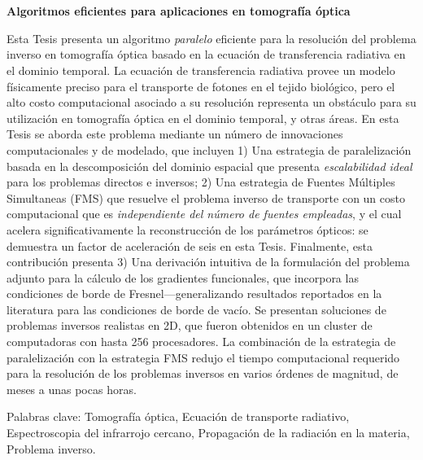 \pagestyle{empty}
\chapter*{}

\begin{center}
\begin{large}
\textbf{Algoritmos eficientes para aplicaciones en tomografía óptica}
\end{large}
\end{center}

\vspace{1cm}
Esta Tesis presenta un algoritmo {\em paralelo} eficiente  
para la resolución del problema inverso en 
tomografía óptica basado en la ecuación de transferencia radiativa en el dominio temporal. 
La ecuación de transferencia radiativa provee un modelo 
físicamente preciso para el transporte de fotones 
en el tejido biológico, pero el alto costo computacional 
asociado a su resolución representa un obstáculo 
para su utilización en tomografía óptica en el dominio 
temporal, y otras áreas. En esta Tesis se aborda este problema 
mediante un número de innovaciones computacionales y de 
modelado, que incluyen 1) Una estrategia de paralelización 
basada en la descomposición del dominio espacial que presenta 
\textit{escalabilidad ideal} para los problemas directos 
e inversos; 2) Una estrategia de Fuentes Múltiples Simultaneas 
(FMS) que resuelve el problema inverso de transporte 
con un costo computacional que es {\em independiente del 
número de fuentes empleadas}, y el cual acelera significativamente la reconstrucción de los parámetros ópticos: 
se demuestra un factor de aceleración de seis en esta Tesis. 
Finalmente, esta contribución presenta 3) Una derivación 
intuitiva de la formulación del problema adjunto para la 
cálculo de los gradientes funcionales, que incorpora 
las condiciones de borde de Fresnel---generalizando 
resultados reportados en la literatura para las condiciones 
de borde de vacío. Se presentan 
soluciones de problemas inversos realistas en 2D, 
que fueron obtenidos en un cluster de computadoras con 
hasta 256 procesadores. La combinación de la estrategia 
de paralelización con la estrategia FMS redujo el tiempo 
computacional requerido para la resolución de los problemas inversos en varios órdenes de magnitud, de meses a unas pocas horas. 

\vspace{1cm}
\noindent
Palabras clave: 
Tomografía óptica,
Ecuación de transporte radiativo, 
Espectroscopia del infrarrojo cercano, 
Propagación de la radiación en la materia,
Problema inverso.
\pagestyle{empty}
